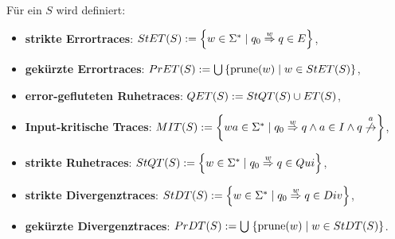 \begin{frame}
  \begin{Def}[Traces]
    Für ein \EIO{} $S$ wird definiert:
    \begin{itemize}
      \item \textbf{strikte Errortraces}: $StET{}(S):=\left\{w\in\Sigma
        ^*\mid q_0\overset{w}{\Rightarrow}q\in E\right\}$,
      \item \textbf{gekürzte Errortraces}: $PrET{}(S):=\bigcup\left\{\mathrm{prune}{}(w)\mid w\in
        StET{}(S)\right\}$,
      \item \textbf{error-gefluteten Ruhetraces}: $QET{}(S) := StQT{}(S)\cup
        ET{}(S)$,
      \item \textbf{Input-kritische Traces}: $\MIT{}(S):=\left\{wa\in\Sigma ^*\mid
        q_0\overset{w}{\Rightarrow}q\wedge a\in I\wedge
      q\overset{a}{\not{\hspace{-0.1cm}\rightarrow}}\right\}$,
      \item<2-> \textbf{strikte Ruhetraces}: $StQT{}(S) := \left\{w\in\Sigma ^*\mid q_0
        \overset{w}{\Rightarrow} q\in Qui\right\}$,
      \item<3-> \textbf{strikte Divergenztraces}: $StDT{}(S) := \left\{w\in\Sigma
          ^*\mid
        q_0 \overset{w}{\Rightarrow} q\in Div\right\}$,
      \item<3-> \textbf{gekürzte Divergenztraces}: $PrDT{}(S) :=
        \bigcup\hspace{1pt}\left\{\mathrm{prune}{}(w)\mid w\in StDT{}(S)\right\}$.
    \end{itemize}
  \end{Def}
\end{frame}

